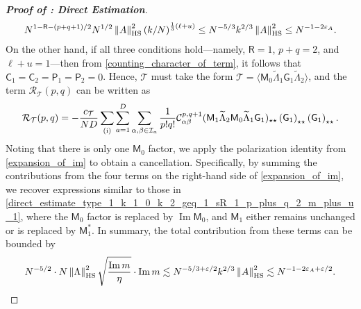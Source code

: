 \documentclass[10pt,reqno]{amsart}
\numberwithin{equation}{section}
\numberwithin{figure}{section}
\theoremstyle{plain} %
\theoremstyle{definition} %
\newcommand{\wt}{\widetilde}
\renewcommand{\txt}[1]{\text{\rm{#1}}}
\newcommand{\cT}{\mathcal T}
\newcommand{\cI}{\mathcal{I}}
\newcommand{\cC}{\mathcal{C}}
\newcommand{\cR}{{\mathcal R}}
\newcommand{\sG}{\mathsf G}
\newcommand{\sM}{\mathsf M}
\newcommand{\sR}{\mathsf R}
\newcommand{\sC}{\mathsf C}
\newcommand{\sP}{\mathsf P}
\renewcommand{\leq}{\le}
\newcommand{\p}[1]{({#1})}
\newcommand{\pa}[1]{\left({#1}\right)}
\newcommand{\norma}[1]{\left\lVert #1 \right\rVert}
\newcommand{\avg}[1]{\langle #1 \rangle}
\DeclareMathOperator{\im}{\mathrm{Im}}
\newcommand{\tLambda}{{\wt{\Lambda}}}
\newcommand{\HS}{\txt{HS}}
\newcommand{\bsum}[3]{\sum_{#1=1}^D\sum_{#2,#3\in \cI_{#1}}}
\newcommand{\iab}{\alpha\beta}
\newcommand{\tl}{\tLambda}
\newcommand{\mm}{\ell}
\numberwithin{equation}{section}
\begin{document}
\begin{proof}[\bf Proof of : Direct Estimation]
         \begin{equation}\nonumber
             \begin{aligned}
                 N^{1-\sR-\pa{p+q+1}/2}N^{1/2}\norma{A}_{\HS}^2\pa{k/N }^{\frac 1 3(\mm+u)}\leq N^{-5/3}k^{2/3}\norma{A}_{\HS}^2\leq N^{-1-2\varepsilon_A}.
             \end{aligned}
         \end{equation}
     On the other hand, if all three conditions hold---namely, $\sR = 1$, $p + q = 2$, and $\mm + u = 1$---then from \eqref{counting_character_of_term}, it follows that $\sC_1 = \sC_2 = \sP_1 = \sP_2 = 0$. Hence, $\cT$ must take the form $\cT = \avg{\sM_0 \tl_1 \sG_1 \tl_2}$, and the term $\cR_{\cT}(p, q)$ can be written as 
         \begin{equation}\label{direct_estimate_type_1_k_1_0_k_2_geq_1_sR_1_p_plus_q_2_m_plus_u_1}
             \begin{aligned}
                 \cR_{\cT}(p,q)=-\frac{c_\cT}{ND}\sum_{\pa{\txt{i}}}\bsum{a}{\alpha}{\beta}\frac{1}{p!q!}\cC_{\iab}^{p,q+1}\p{\sM_1\tl_2\sM_0\tl_1\sG_1}_{\star\star}\pa{\sG_1}_{\star\star}\pa{\sG_1}_{\star\star}.
             \end{aligned}
         \end{equation}
         Noting that there is only one $\sM_0$ factor, we apply the polarization identity from \eqref{expansion_of_im} to obtain a cancellation.  Specifically, by summing the contributions from the four terms on the right-hand side of \eqref{expansion_of_im}, we recover expressions similar to those in \eqref{direct_estimate_type_1_k_1_0_k_2_geq_1_sR_1_p_plus_q_2_m_plus_u_1}, where the $\sM_0$ factor is replaced by $\im \sM_0$, and $\sM_1$ either remains unchanged or is replaced by $\sM_1^*$. In summary, the total contribution from these terms can be bounded by 
         \begin{equation}\nonumber
             \begin{aligned}
                 N^{-5/2}\cdot N\norma{\Lambda}_{\HS}^2\sqrt{\frac{\im m}{\eta}}\cdot \im m\lesssim N^{-5/3+\varepsilon/2}k^{2/3}\norma{A}_{\HS}^2\lesssim N^{-1-2\varepsilon_A+\varepsilon/2}.
             \end{aligned}
         \end{equation}
         



\end{proof}
\end{document}
